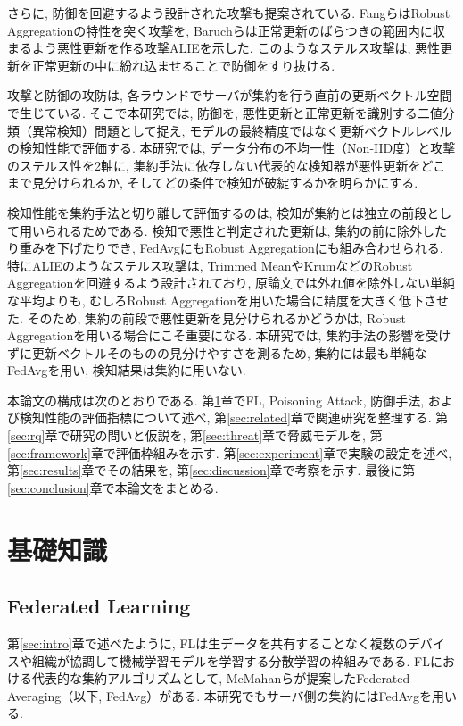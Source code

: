 \documentclass[a4j, twocolumn, dvipdfmx]{jsarticle}
\begin{document}
さらに, 防御を回避するよう設計された攻撃も提案されている. Fangら\cite{fang2020local}はRobust Aggregationの特性を突く攻撃を, Baruchら\cite{baruch2019little}は正常更新のばらつきの範囲内に収まるよう悪性更新を作る攻撃ALIEを示した. このようなステルス攻撃は, 悪性更新を正常更新の中に紛れ込ませることで防御をすり抜ける.

攻撃と防御の攻防は, 各ラウンドでサーバが集約を行う直前の更新ベクトル空間で生じている. そこで本研究では, 防御を, 悪性更新と正常更新を識別する二値分類（異常検知）問題として捉え, モデルの最終精度ではなく更新ベクトルレベルの検知性能で評価する. 本研究では, データ分布の不均一性（Non-IID度）と攻撃のステルス性を2軸に, 集約手法に依存しない代表的な検知器が悪性更新をどこまで見分けられるか, そしてどの条件で検知が破綻するかを明らかにする.

検知性能を集約手法と切り離して評価するのは, 検知が集約とは独立の前段として用いられるためである. 検知で悪性と判定された更新は, 集約の前に除外したり重みを下げたりでき, FedAvgにもRobust Aggregationにも組み合わせられる. 特にALIEのようなステルス攻撃は, Trimmed MeanやKrumなどのRobust Aggregationを回避するよう設計されており, 原論文では外れ値を除外しない単純な平均よりも, むしろRobust Aggregationを用いた場合に精度を大きく低下させた\cite{baruch2019little}. そのため, 集約の前段で悪性更新を見分けられるかどうかは, Robust Aggregationを用いる場合にこそ重要になる. 本研究では, 集約手法の影響を受けずに更新ベクトルそのものの見分けやすさを測るため, 集約には最も単純なFedAvgを用い, 検知結果は集約に用いない.

本論文の構成は次のとおりである. 第\ref{sec:prelim}章でFL, Poisoning Attack, 防御手法, および検知性能の評価指標について述べ, 第\ref{sec:related}章で関連研究を整理する. 第\ref{sec:rq}章で研究の問いと仮説を, 第\ref{sec:threat}章で脅威モデルを, 第\ref{sec:framework}章で評価枠組みを示す. 第\ref{sec:experiment}章で実験の設定を述べ, 第\ref{sec:results}章でその結果を, 第\ref{sec:discussion}章で考察を示す. 最後に第\ref{sec:conclusion}章で本論文をまとめる.


\section{基礎知識}
\label{sec:prelim}

\subsection{Federated Learning}
第\ref{sec:intro}章で述べたように, FLは生データを共有することなく複数のデバイスや組織が協調して機械学習モデルを学習する分散学習の枠組みである\cite{mammen2021fl}. FLにおける代表的な集約アルゴリズムとして, McMahanら\cite{mcmahan2017fedavg}が提案したFederated Averaging（以下, FedAvg）がある. 本研究でもサーバ側の集約にはFedAvgを用いる.
\end{document}
